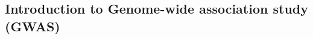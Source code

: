 \documentclass[compress]{beamer}
\begin{document}
\subsection{Introduction to Genome-wide association study (GWAS)}
%
%
%
\end{document}
